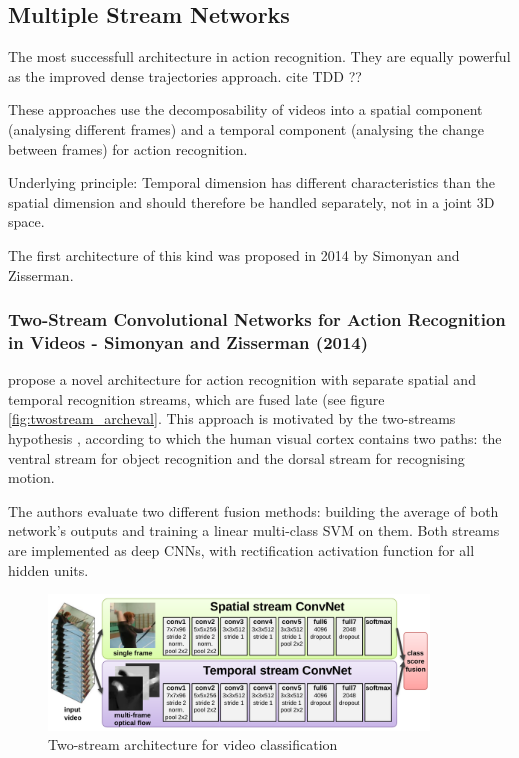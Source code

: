 \newpage
\subsection{Multiple Stream Networks}

The most successfull architecture in action recognition. They are equally powerful as the improved dense trajectories approach. cite TDD ??

These approaches use the decomposability of videos into a spatial component (analysing different frames) and a temporal component (analysing the change between frames) for action recognition.

Underlying principle: Temporal dimension has different characteristics than the spatial dimension and should therefore be handled separately, not in a joint 3D space.

The first architecture of this kind was proposed in 2014 by Simonyan and Zisserman.


\subsubsection{Two-Stream Convolutional Networks for Action Recognition in Videos - Simonyan and Zisserman (2014)}

\textcite{simonyan_two-stream_2014} propose a novel architecture for action recognition with separate spatial and temporal recognition streams, which are fused late (see figure \ref{fig:twostream_archeval}.
This approach is motivated by the two-streams hypothesis \cite{goodale_separate_1992}, according to which the human visual cortex contains two paths: the ventral stream for object recognition and the dorsal stream for recognising motion.

The authors evaluate two different fusion methods: building the average of both network's outputs and training a linear multi-class SVM on them.
Both streams are implemented as deep CNNs, with rectification activation function for all hidden units.

\begin{figure}[H]
    \centering
    \includegraphics[width=0.9\textwidth]{img_deep/twostream_architecture}
    \caption{Two-stream architecture for video classification \cite{simonyan_two-stream_2014}}
    \label{fig:twostream_architecture}
\end{figure}


